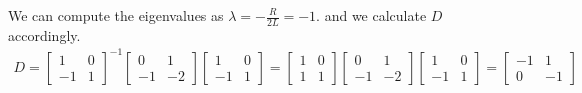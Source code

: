 {  We can compute the eigenvalues as $\lambda = -\frac{R}{2L} = -1.$ and we calculate $D$ accordingly.
  \begin{align*} 
  D = \begin{bmatrix} 1 & 0 \\ -1 & 1 \end{bmatrix}^{-1}
  \begin{bmatrix} 0 & 1 \\ -1 & - 2 \end{bmatrix}
  \begin{bmatrix} 1 & 0 \\ -1 & 1 \end{bmatrix}
  = \begin{bmatrix} 1 & 0 \\ 1 & 1 \end{bmatrix}
  \begin{bmatrix} 0 & 1 \\ -1 & - 2 \end{bmatrix}
  \begin{bmatrix} 1 & 0 \\ -1 & 1 \end{bmatrix}
  = \begin{bmatrix} -1 & 1 \\ 0 & -1 \end{bmatrix}
  \end{align*}

}
